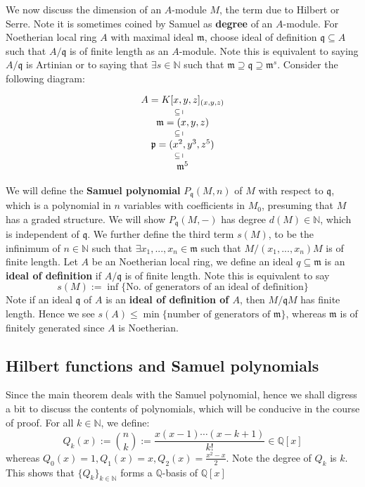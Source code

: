 \documentclass[12pt]{article}
\theoremstyle{definition}
\theoremstyle{plain}
\newcommand{\nat}{\mathbb{N}}
\newcommand{\rat}{\mathbb{Q}}
\begin{document}
\bigskip
We now discuss the dimension of an $A$-module $M$, the term due to Hilbert or Serre. Note it is sometimes coined by Samuel as \textbf{degree} of an $A$-module.
For Noetherian local ring $A$ with maximal ideal $\mathfrak{m}$, choose ideal of definition $\mathfrak{q}\subseteq A$ such that $A/\mathfrak{q}$ is of finite length as an $A$-module. Note this is equivalent to saying $A/\mathfrak{q}$ is Artinian or to saying that $\exists s\in \nat$ such that $\mathfrak{m}\supseteq \mathfrak{q}\supseteq \mathfrak{m}^s$.
\Exe Consider the following diagram:
\begin{equation}
  \begin{tikzcd}[row sep=tiny]
  A=K[x, y, z]_{(x, y, z)}\\
  \mathfrak{m}=(x, y, z)\uar[-]{\subseteq}\\
  \mathfrak{p}=(x^2, y^3, z^5)\uar[-]{\subseteq}\\
  \mathfrak{m}^5\uar[-]{\subseteq}
  \end{tikzcd}
\end{equation}

\medskip
We will define the \textbf{Samuel polynomial} $P_\mathfrak{q}(M, n)$ of $M$ with respect to $\mathfrak{q}$, which is a polynomial in $n$ variables with coefficients in $M_0$, presuming that $M$ has a graded structure.  We will show $P_\mathfrak{q}(M, -)$ has degree $d(M)\in \nat$, which is independent of $\mathfrak{q}$.
We further define the third term $s(M)$, to be the infinimum of $n\in \nat$ such that $\exists x_1, ..., x_n\in \mathfrak{m}$ such that $M/(x_1, ..., x_n)M$ is of finite length.
\Def Let $A$ be an Noetherian local ring, we define an ideal $q\subseteq \mathfrak{m}$ is an \textbf{ideal of definition} if $A/\mathfrak{q}$ is of finite length. Note this is equivalent to say
\[s(M):=\inf\{\text{No. of generators of an ideal of definition}\}\]
\Rmk Note if an ideal $\mathfrak{q}$ of $A$ is an \textbf{ideal of definition of $A$}, then $M/\mathfrak{q}M$ has finite length. Hence we see $s(A)\leq \min\{\text{number of generators of }\mathfrak{m}\}$, whereas $\mathfrak{m}$ is of finitely generated since $A$ is Noetherian.

\subsection{Hilbert functions and Samuel polynomials}
Since the main theorem deals with the Samuel polynomial, hence we shall digress a bit to discuss the contents of polynomials, which will be conducive in the course of proof.
\Def For all $k\in \nat$, we define:
\[Q_k(x):=\binom{n}{k}:=\frac{x(x-1)\cdots(x-k+1)}{k!}\in \rat[x]\]
whereas $Q_0(x)=1, Q_1(x)=x, Q_2(x)=\frac{x^2-x}{2}$.
\Rmk Note the degree of $Q_k$ is $k$. This shows that $\{Q_k\}_{k\in \nat}$ forms a $\rat$-basis of $\rat[x]$
\end{document}
